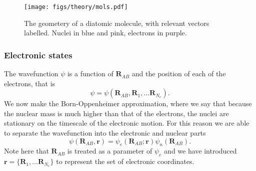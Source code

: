 \begin{figure}
  \centering
  \texttt{[image: figs/theory/mols.pdf]}
  \caption[Geometry of a diatomic molecule]{
    The geometery of a diatomic molecule, with relevant vectors labelled.
    Nuclei in blue and pink, electrons in purple.
  }
  \label{theory:fig:mol}
\end{figure}


\subsubsection{Electronic states}

The wavefunction
$\psi$ is a function of $\mathbf{R}_{AB}$ and the position of each of the
electrons, that is
%
\begin{equation}
  \psi = \psi(\mathbf{R}_{AB}, \mathbf{R}_1, \dots \mathbf{R}_{N_e}).
\end{equation}
%
We now make the Born-Oppenheimer approximation, where we say that because the
nuclear mass is much higher than that of the electrons, the nuclei are
stationary on the timescale of the electronic motion. For this
reason we are able to separate the wavefunction into the electronic and nuclear
parts
%
\begin{equation}
  \psi(\mathbf{R}_{AB}, \mathbf{r}) = \psi_e(\mathbf{R}_{AB}; \mathbf{r})
  \psi_n(\mathbf{R}_{AB}).
\end{equation}
%
Note here that $\mathbf{R}_{AB}$ is treated as a parameter of $\psi_e$ and we
have introduced $\mathbf{r} = \{\mathbf{R}_1, \dots \mathbf{R}_{N_e} \}$ to
represent the set of electronic coordinates.

